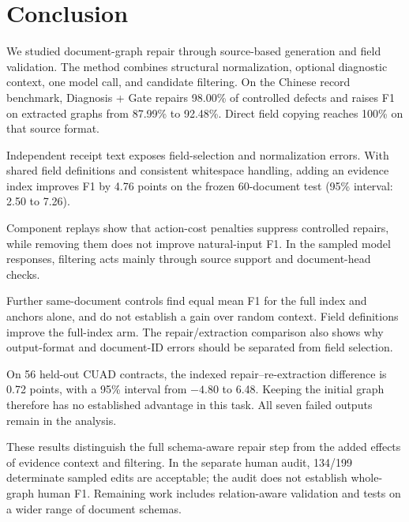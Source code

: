 \section{Conclusion}
\label{sec:conclusion}

We studied document-graph repair through source-based generation and field
validation. The method combines structural normalization, optional diagnostic
context, one model call, and candidate filtering. On the Chinese record
benchmark, Diagnosis + Gate repairs 98.00\% of controlled defects and raises
F1 on extracted graphs from 87.99\% to 92.48\%. Direct field copying reaches
100\% on that source format.

Independent receipt text exposes field-selection and normalization errors.
With shared field definitions and consistent whitespace handling, adding an
evidence index improves F1 by 4.76 points on the frozen 60-document test
(95\% interval: 2.50 to 7.26).

Component replays show that action-cost penalties suppress controlled repairs,
while removing them does not improve natural-input F1. In the sampled model
responses, filtering acts mainly through source support and document-head checks.

Further same-document controls find equal mean F1 for the full index and
anchors alone, and do not establish a gain over random context. Field
definitions improve the full-index arm. The repair/extraction comparison
also shows why output-format and document-ID errors should be separated
from field selection.

On 56 held-out CUAD contracts, the indexed repair--re-extraction difference
is 0.72 points, with a 95\% interval from $-4.80$ to 6.48. Keeping the initial
graph therefore has no established advantage in this task. All seven failed
outputs remain in the analysis.

These results distinguish the full schema-aware repair step from the added
effects of evidence context and filtering. In the separate human audit,
134/199 determinate sampled edits are acceptable; the audit does not establish
whole-graph human F1. Remaining work includes relation-aware validation and
tests on a wider range of document schemas.
